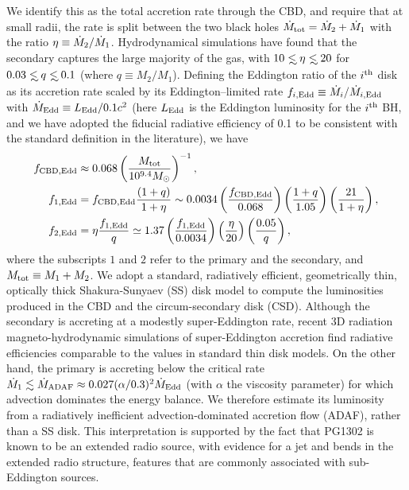 We identify this as the total accretion rate through the CBD, and
require that at small radii, the rate is split between the two black
holes $\dot{M}_{\rm tot} = \dot{M}_2 + \dot{M}_1$ with the ratio $\eta\equiv
\dot{M}_2/\dot{M}_1$.  Hydrodynamical simulations\cite{Farris:2014} have
found that the secondary captures the large majority of the gas, with
$10\lsim \eta \lsim 20$ for $0.03\lsim q \lsim 0.1$ (where $q\equiv
M_2/M_1$).  Defining the Eddington ratio of the $i^{\rm{th}}$ disk as
its accretion rate scaled by its Eddington--limited rate
$f_{i,\rm{Edd}}\equiv \dot{M}_i/\dot{M}_{i,\rm{Edd}}$ with $\dot{M}_{\rm
  Edd} \equiv L_{\rm Edd}/0.1c^2$ (here $L_{\rm Edd}$ is the Eddington
luminosity for the $i^{\rm th}$ BH, and we have adopted the fiducial
radiative efficiency of 0.1 to be consistent with the standard
definition in the literature), we have
%
\begin{align}
f_{\rm{CBD,Edd}} & \approx   0.068 \left( \frac{M_{\rm tot}}{10^{9.4} \Msun} \right)^{-1}, \nonumber \\
%
f_{\rm{1,Edd}} &= f_{\rm{CBD,Edd}}  \frac{ \left( 1+q \right)}{1 + \eta}  \sim 0.0034 \left( \frac{ f_{\rm{CBD,Edd}}}{0.068} \right) \left(\frac{1+q}{1.05}\right) \left( \frac{21}{1+\eta}\right), \nonumber \\
%
f_{\rm{2,Edd}} &=\eta \frac{f_{\rm{1,Edd}}}{q} \simeq 1.37  \left( \frac{ f_{\rm{1,Edd}}}{0.0034} \right) \left( \frac{\eta}{20}\right) \left( \frac{0.05}{q}\right),
%
\label{Eq:TDfEdds}
\end{align}
%
where the subscripts $1$ and $2$ refer to the primary and the
secondary, and $M_{\rm tot} \equiv M_1 + M_2$.  We adopt a standard,
radiatively efficient, geometrically thin, optically thick
Shakura-Sunyaev (SS) disk model\cite{SS73} to compute the luminosities
produced in the CBD and the circum-secondary disk (CSD). Although the
secondary is accreting at a modestly super-Eddington rate, recent 3D
radiation magneto-hydrodynamic simulations of super-Eddington
accretion find radiative efficiencies comparable to the values in
standard thin disk models\cite{Jiang+2014}.  On the other hand, the
primary is accreting below the critical rate $\dot{M}_{\rm{1}}
\lesssim \dot{M}_{\rm{ADAF}} \approx 0.027 (\alpha/0.3)^2
\dot{M}_{\rm{Edd}}$ (with $\alpha$ the viscosity parameter) for which
advection dominates the energy balance\cite{NarayanMcClintock2008}. We
therefore estimate its luminosity from a radiatively inefficient
advection-dominated accretion flow (ADAF)\cite{Mahadevan:1997,
  NMQ:ADAF:1998}, rather than a SS disk.  This interpretation is
supported by the fact that PG1302 is known to be an extended radio
source, with evidence for a jet and bends in the extended radio
structure\cite{Hutchings+2014}, features that are commonly associated
with sub-Eddington sources\cite{WangHoStaubert2003}.

